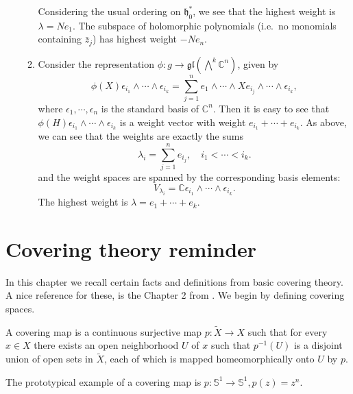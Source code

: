 \documentclass{report}
\begin{document}
\begin{example}
\begin{enumerate}[label = (\roman*)]
\begin{enumerate}[label = (\alph*)]
        Considering the usual ordering on $\mathfrak h_0^*$, we see that the highest weight is $\lambda = N e_1$.
        The subspace of holomorphic polynomials (i.e.\ no monomials containing $\bar z_j$) has highest weight $-N e_n$.
        \item Consider the representation $\phi: g \to \mathfrak{gl}(\bigwedge^k \mathbb C^n)$, given by
        \[
        \phi(X) \epsilon_{i_1} \wedge \cdots \wedge \epsilon_{i_k} = \sum_{j=1}^n e_1 \wedge \cdots \wedge X e_{i_j} \wedge \cdots \wedge \epsilon_{i_k},
        \]
        where $\epsilon_1, \cdots, \epsilon_n$ is the standard basis of $\mathbb C^n$.
        Then it is easy to see that $\phi(H) \epsilon_{i_1} \wedge \cdots \wedge \epsilon_{i_k}$ is a weight vector with weight $e_{i_1} + \cdots + e_{i_k}$.
        As above, we can see that the weights are exactly the sums
        \[
        \lambda_i = \sum_{j=1}^n e_{i_j}, \quad i_1 < \cdots < i_k.
        \]
        and the weight spaces are spanned by the corresponding basis elements:
        \[
        V_{\lambda_i} = \mathbb C \epsilon_{i_1} \wedge \cdots \wedge \epsilon_{i_k}.
        \]
        The highest weight is $\lambda = e_1 + \cdots + e_k$.
    \end{enumerate}
    
\end{enumerate}
\end{example}



\appendix

\chapter{Covering theory reminder}
In this chapter we recall certain facts and definitions from basic covering theory.
A nice reference for these, is the Chapter 2 from \cite{hatcher2002topology}.
We begin by defining covering spaces.
\begin{definition}
    A covering map is a continuous surjective map $p: \tilde X \to X$ such that for every $x \in X$ there exists an open neighborhood $U$ of $x$ such that $p^{-1}(U)$ is a disjoint union of open sets in $\tilde X$, each of which is mapped homeomorphically onto $U$ by $p$.
\end{definition}
The prototypical example of a covering map is $p: \mathbb S^1 \to \mathbb S^1, p(z) = z^n$.
\end{document}
